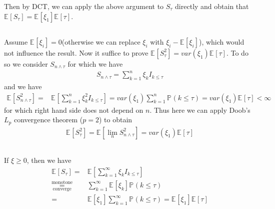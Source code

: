 \documentclass[11pt,a4paper]{ctexart}
\numberwithin{equation}{section}%
\begin{document}
Then by DCT, we can apply the above argument to $ S_\tau $ directly and obtain that $ \mathbb{E}_{  }\left[ S_\tau \right] = \mathbb{E}_{  }\left[ \xi _1 \right] \mathbb{E}_{  }\left[ \tau \right]   $.

\subsection{}

Assume $ \mathbb{E}_{  }\left[ \xi _i \right] = 0  $(otherwise we can replace $ \xi _i $ with $ \xi _i-\mathbb{E}_{  }\left[ \xi _i \right]  $), which would not influence the result. Now it suffice to prove $ \mathbb{E}_{  }\left[ S_\tau^2 \right] =var(\xi _1)\mathbb{E}_{  }\left[ \tau \right]  $. To do so we consider $ S_{n\wedge \tau} $ for which we have
\begin{align*}
    S_{n\wedge \tau}=\sum_{k=1}^n \xi _k I_{k\leq \tau} 
\end{align*}
and we have
\begin{align*}
    \mathbb{E}_{  }\left[ S_{n\wedge \tau}^2 \right] =& \mathbb{E}_{  }\left[ \sum_{k=1}^n \xi _k^2 I_{k\leq \tau} \right] = var(\xi _1)\sum_{k=1}^n \mathbb{P}_{  }\left( k\leq \tau \right) = var(\xi _1)\mathbb{E}_{  }\left[ \tau \right] <\infty
\end{align*}
for which right hand side does not depend on $ n $. Thus here we can apply Doob's $ L_p $ convergence theorem ($ p=2 $) to obtain 
\begin{align*}
    \mathbb{E}_{  }\left[ S_\tau^2 \right] = \mathbb{E}_{  }\left[ \lim_n S_{n\wedge \tau}^2 \right] = var(\xi _1)\mathbb{E}_{  }\left[ \tau \right]  
\end{align*}


\subsection{}

If $ \xi \geq 0 $, then we have
    \begin{align*}
        \mathbb{E}_{  }\left[ S_\tau \right]=& \mathbb{E}_{  }\left[ \sum_{k=1}^\infty \xi _k I_{k\leq \tau} \right] \\
        \mathop{ = }\limits^{\text{monotone}}_{\text{converge}} & \sum_{k=1}^\infty \mathbb{E}_{  }\left[ \xi _k \right] \mathbb{P}_{  }\left( k\leq \tau \right) \\
        =&\mathbb{E}_{  }\left[\xi _1 \right]\sum_{k=1}^\infty \mathbb{P}_{  }\left( k\leq \tau \right) = \mathbb{E}_{  }\left[ \xi _1  \right] \mathbb{E}_{  }\left[ \tau \right] 
    \end{align*}
\end{document}
